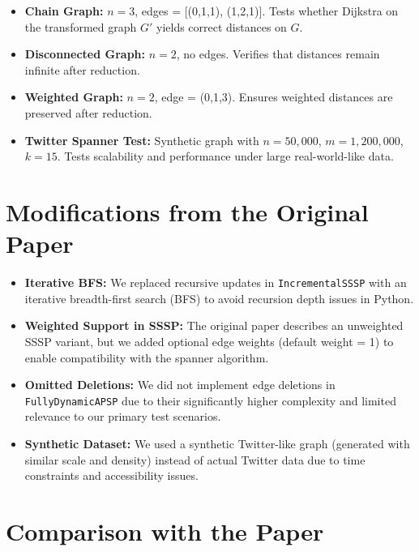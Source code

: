 \documentclass[12pt]{article}
\begin{document}
\begin{itemize}
    \item \textbf{Chain Graph:} $n = 3$, edges = [(0,1,1), (1,2,1)]. Tests whether Dijkstra on the transformed graph $G'$ yields correct distances on $G$.
    
    \item \textbf{Disconnected Graph:} $n = 2$, no edges. Verifies that distances remain infinite after reduction.
    
    \item \textbf{Weighted Graph:} $n = 2$, edge = (0,1,3). Ensures weighted distances are preserved after reduction.
    
    \item \textbf{Twitter Spanner Test:} Synthetic graph with $n = 50,000$, $m = 1,200,000$, $k = 15$. Tests scalability and performance under large real-world-like data.
\end{itemize}


\section*{Modifications from the Original Paper}

\begin{itemize}
    \item \textbf{Iterative BFS:} We replaced recursive updates in \texttt{IncrementalSSSP} with an iterative breadth-first search (BFS) to avoid recursion depth issues in Python.
    
    \item \textbf{Weighted Support in SSSP:} The original paper describes an unweighted SSSP variant, but we added optional edge weights (default weight = 1) to enable compatibility with the spanner algorithm.
    
    \item \textbf{Omitted Deletions:} We did not implement edge deletions in \texttt{FullyDynamicAPSP} due to their significantly higher complexity and limited relevance to our primary test scenarios.
    
    \item \textbf{Synthetic Dataset:} We used a synthetic Twitter-like graph (generated with similar scale and density) instead of actual Twitter data due to time constraints and accessibility issues.
\end{itemize}

\section*{Comparison with the Paper}
\end{document}
